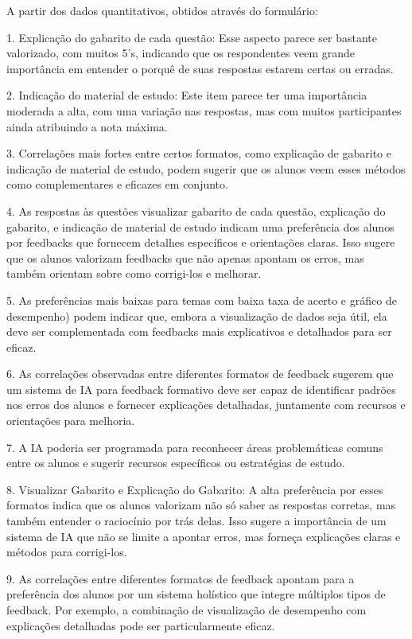 A partir dos dados quantitativos, obtidos através do formulário: 

1. Explicação do gabarito de cada questão: Esse aspecto parece ser bastante valorizado, com muitos 5's, indicando que os respondentes veem grande importância em entender o porquê de suas respostas estarem certas ou erradas.

2. Indicação do material de estudo: Este item parece ter uma importância moderada a alta, com uma variação nas respostas, mas com muitos participantes ainda atribuindo a nota máxima.

3. Correlações mais fortes entre certos formatos, como explicação de gabarito e indicação de material de estudo, podem sugerir que os alunos veem esses métodos como complementares e eficazes em conjunto.

4. As respostas às questões visualizar gabarito de cada questão, explicação do gabarito, e indicação de material de estudo indicam uma preferência dos alunos por feedbacks que fornecem detalhes específicos e orientações claras. Isso sugere que os alunos valorizam feedbacks que não apenas apontam os erros, mas também orientam sobre como corrigi-los e melhorar.

5. As preferências mais baixas para temas com baixa taxa de acerto e gráfico de desempenho) podem indicar que, embora a visualização de dados seja útil, ela deve ser complementada com feedbacks mais explicativos e detalhados para ser eficaz.

6. As correlações observadas entre diferentes formatos de feedback sugerem que um sistema de IA para feedback formativo deve ser capaz de identificar padrões nos erros dos alunos e fornecer explicações detalhadas, juntamente com recursos e orientações para melhoria.

7. A IA poderia ser programada para reconhecer áreas problemáticas comuns entre os alunos e sugerir recursos específicos ou estratégias de estudo.

8. Visualizar Gabarito e Explicação do Gabarito: A alta preferência por esses formatos indica que os alunos valorizam não só saber as respostas corretas, mas também entender o raciocínio por trás delas. Isso sugere a importância de um sistema de IA que não se limite a apontar erros, mas forneça explicações claras e métodos para corrigi-los.

9. As correlações entre diferentes formatos de feedback apontam para a preferência dos alunos por um sistema holístico que integre múltiplos tipos de feedback. Por exemplo, a combinação de visualização de desempenho com explicações detalhadas pode ser particularmente eficaz.

